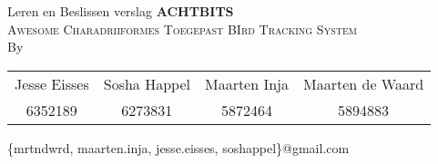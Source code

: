 \begin{titlepage}



\begin{center}

\textmd{Leren en Beslissen verslag}
\vfill
{ \huge \textbf{ACHTBITS} \\\large \textsc{Awesome Charadriiformes Toegepast
BIrd Tracking System}
}\\[0.4cm]
\vfill
By\\
\vfill
\begin{tabular}{cccc}
Jesse Eisses & Sosha Happel & Maarten Inja & Maarten de Waard \\ 
6352189 & 6273831 & 5872464 & 5894883 
\end{tabular}
\vfill
\{mrtndwrd, maarten.inja, jesse.eisses, soshappel\}@gmail.com
\end{center}





\end{titlepage}

